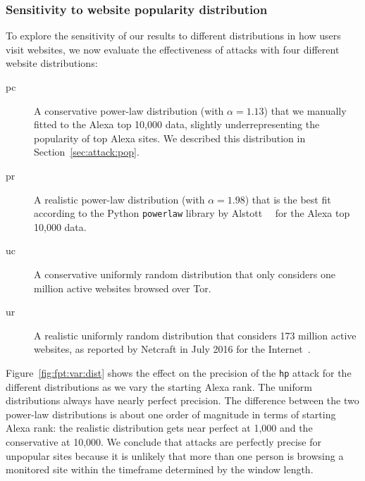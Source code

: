 
\subsubsection{Sensitivity to website popularity distribution}

To explore the sensitivity of our results to different distributions in
how users visit websites, we now evaluate the effectiveness of \name
attacks with four different website distributions:
\begin{description}
	\item[pc] A conservative power-law distribution
	(with $\alpha=1.13$)
	that we manually fitted to the Alexa top 10,000 data,
	slightly underrepresenting the popularity of top Alexa sites.
	We described this distribution in Section~\ref{sec:attack:pop}.
	\item[pr] A realistic power-law distribution
	(with $\alpha=1.98$)
	that is the best fit according to
	the Python {\tt powerlaw} library by Alstott~\ea~\cite{Alstott2014a} for the Alexa
	top 10,000 data.
	\item[uc] A conservative uniformly random distribution that
	only considers one million active websites browsed over Tor.
	\item[ur] A realistic uniformly random distribution that
          considers 173 million active websites, as reported by Netcraft
          in July 2016 for the Internet~\cite{numberofwebsites}.
\end{description}
Figure~\ref{fig:fpt:var:dist} shows the effect on the precision of the
\texttt{hp} attack for the different distributions as we vary the starting
Alexa rank. The uniform distributions always have nearly perfect precision.
The difference between the two power-law distributions is about one order of
magnitude in terms of starting Alexa rank: the realistic distribution gets
near perfect at 1,000 and the conservative at 10,000.
We conclude that \name attacks are perfectly precise for unpopular sites
because it is unlikely that more than one person is browsing a monitored site
within the timeframe determined by the window length.
